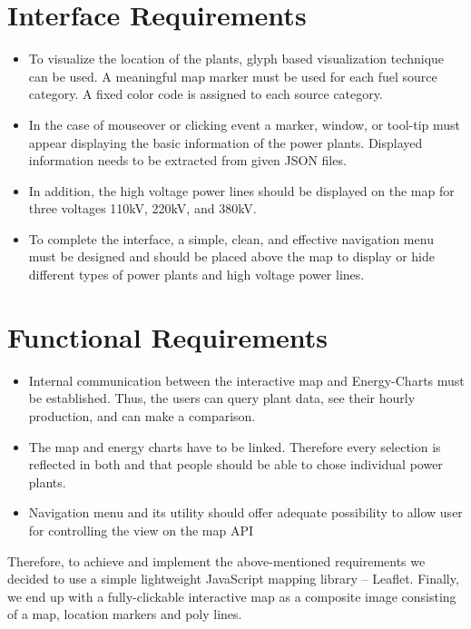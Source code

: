 \section*{Interface Requirements}
\begin{itemize}
	\item{To visualize the location of the plants, glyph based visualization technique can be used. A meaningful map marker must be used for each fuel source category. A fixed color code is assigned to each source category.}
	\item{In the case of mouseover or clicking event a marker, window, or tool-tip must appear displaying the basic information of the power plants. Displayed information needs to be extracted from given JSON files.}
	\item{In addition, the high voltage power lines should be displayed on the map for three voltages 110kV, 220kV, and 380kV.}
	\item{To complete the interface, a simple, clean, and effective navigation menu must be designed and should be placed above the map to display or hide different types of power plants and high voltage power lines.}
\end{itemize}

\section*{Functional Requirements}

\begin{itemize}
	\item{Internal communication between the interactive map and Energy-Charts must be established. Thus, the users can query plant data, see their hourly production, and can make a comparison.}
	\item{The map and energy charts have to be linked. Therefore every selection is reflected in both and that people should be able to chose individual power plants.}
	\item{Navigation menu and its utility  should offer adequate possibility to allow user for controlling the view on the map API}
\end{itemize}

Therefore, to achieve and implement the above-mentioned requirements we decided to use a simple lightweight JavaScript mapping library – Leaflet.  Finally, we end up with a fully-clickable interactive map as a composite image consisting of a map, location markers and poly lines. 

